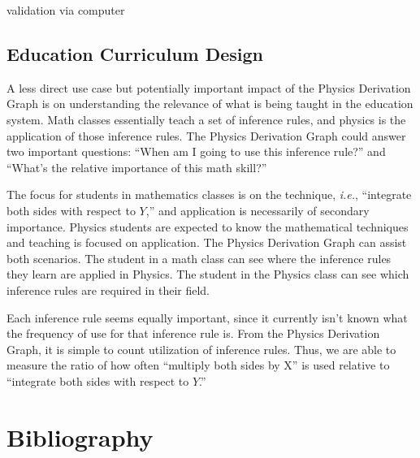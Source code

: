 \documentclass{article}
\newcommand{\ie}{\textit{i.e.}} %
\begin{document}
\begin{multicols}{2}
validation via computer 

\subsection{Education Curriculum Design}

A less direct use case but potentially important impact of the Physics Derivation Graph is on understanding the relevance of what is being taught in the education system. Math classes essentially teach a set of inference rules, and physics is the application of those inference rules. The Physics Derivation Graph could answer two important questions: ``When am I going to use this inference rule?'' and ``What's the relative importance of this math skill?''

The focus for students in mathematics classes is on the technique, \ie, ``integrate both sides with respect to $Y$,'' and application is necessarily of secondary importance. Physics students are expected to know the mathematical techniques and teaching is focused on application. The Physics Derivation Graph can assist both scenarios. The student in a math class can see where the inference rules they learn are applied in Physics. The student in the Physics class can see which inference rules are required in their field. 

Each inference rule seems equally important, since it currently isn't known what the frequency of use for that inference rule is. From the Physics Derivation Graph, it is simple to count utilization of inference rules. Thus, we are able to measure the ratio of how often ``multiply both sides by X'' is used relative to ``integrate both sides with respect to $Y$.'' 

\section{Bibliography}


\end{multicols}

\newpage
\appendix
%
\end{document}

